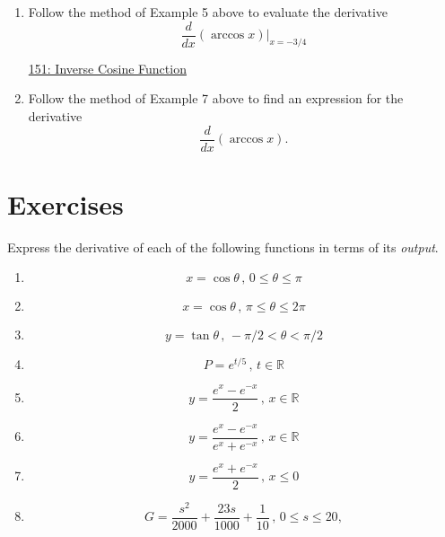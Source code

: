 \documentclass{ximera}
\begin{document}
\begin{exercise} \label{EODFerDFghg}
\begin{enumerate}

\item Follow the method of Example 5 above to evaluate the derivative 
\[
        \frac{d}{dx} \left( \arccos x  \right)\Big|_{x=-3/4}
\]

\begin{onlineOnly}
    \begin{center}
\end{center}
\end{onlineOnly}

\href{https://www.desmos.com/calculator/hgxqjixv4n}{151: Inverse Cosine Function}

\item Follow the method of Example 7 above to find an expression for the derivative
\[
   \frac{d}{dx} \left( \arccos x  \right) .
\]
\end{enumerate}

\end{exercise}

\section{Exercises}

\begin{exercise}  \label{Eggghhybvbxzzz}
Express the derivative of each of the following functions in terms of its \emph{output}.
\begin{enumerate}
\item 
\[
       x = \cos\theta \, , \, 0\leq \theta \leq \pi
\]


\item 
\[
       x = \cos\theta \, , \, \pi\leq \theta \leq 2\pi
\]

\item 
\[
       y = \tan\theta \, , \, -\pi/2 < \theta < \pi/2
\]

\item
\[
     P = e^{t/5} \, , \, t\in \mathbb{R} 
\]

\item 
\[
  y = \frac{e^x - e^{-x}}{2} \, , \, x\in \mathbb{R} 
\]

\item 
\[
  y = \frac{e^x - e^{-x}}{e^x + e^{-x}} \, , \, x\in \mathbb{R} 
\]

\item 
\[
  y = \frac{e^x+ e^{-x}}{2} \, , \, x \leq 0 
\]


\item
\[
   G = \frac{s^2}{2000} + \frac{23s}{1000} + \frac{1}{10} \, , \, 0\leq s\leq 20, 
\]

\end{enumerate}

\end{exercise}
\end{document}
